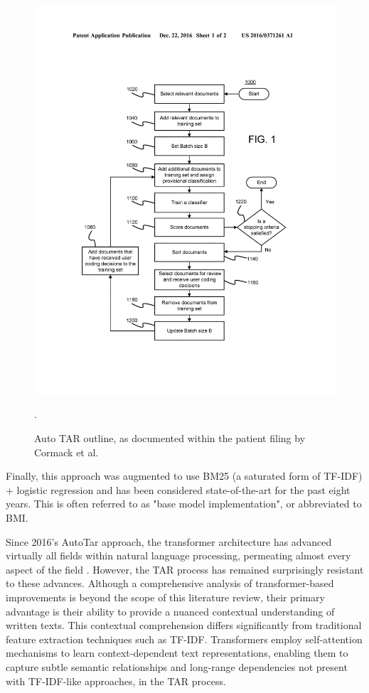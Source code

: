 \documentclass[10pt, english]{article}
\begin{document}
\begin{figure}
    \centering
    \includegraphics[width=1\linewidth]{images/autotar.jpg}
    \caption{Auto TAR outline, as documented within the patient filing by Cormack et al. \cite{cormack_systems_2016}}.
    \label{fig:autotar_process}
\end{figure}
Finally, this approach was augmented to use BM25 (a saturated form of TF-IDF) + logistic regression and has been considered state-of-the-art for the past eight years. This is often referred to as "base model implementation", or abbreviated to BMI.

Since 2016's AutoTar approach, the transformer architecture has advanced virtually all fields within natural language processing, permeating almost every aspect of the field \cite{vaswani_attention_2023}. However, the TAR process has remained surprisingly resistant to these advances. Although a comprehensive analysis of transformer-based improvements is beyond the scope of this literature review, their primary advantage is their ability to provide a nuanced contextual understanding of written texts.
This contextual comprehension differs significantly from traditional feature extraction techniques such as TF-IDF. Transformers employ self-attention mechanisms to learn context-dependent text representations, enabling them to capture subtle semantic relationships and long-range dependencies not present with TF-IDF-like approaches, in the TAR process.
\end{document}
